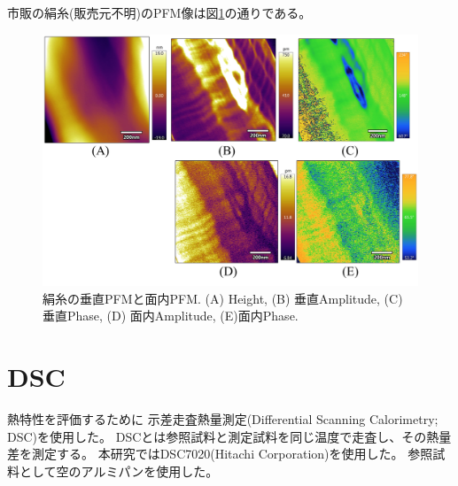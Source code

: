 \documentclass[dvipdfmx,12pt,a4paper]{jreport}
\begin{document}
			\newpage
			市販の絹糸(販売元不明)のPFM像は図\ref{silk_fiber_PFM}の通りである。
			\begin{figure}[h]
				\centering
				\includegraphics[width=\linewidth]{PFM_silk_fiber.jpg}
				\caption{絹糸の垂直PFMと面内PFM. (A) Height, (B) 垂直Amplitude, (C) 垂直Phase, 
				(D) 面内Amplitude, (E)面内Phase.}
				\label{silk_fiber_PFM}
			\end{figure}
			\newpage
			\section{DSC}
		\label{DSC}
		熱特性を評価するために
		示差走査熱量測定(Differential Scanning Calorimetry; DSC)を使用した。
		DSCとは参照試料と測定試料を同じ温度で走査し、その熱量差を測定する。
		本研究ではDSC7020(Hitachi Corporation)を使用した。
		参照試料として空のアルミパンを使用した。
	
\end{document}

